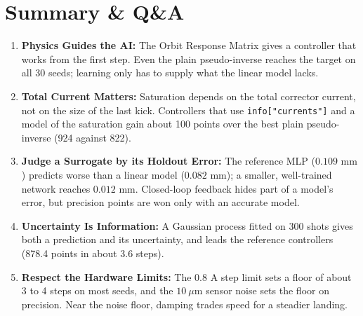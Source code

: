 \documentclass[11pt,a4paper]{article}
\begin{document}
\section{Summary \& Q\&A}

\begin{infobox}
\begin{enumerate}
    \item \textbf{Physics Guides the AI:} The Orbit Response Matrix gives a controller that works from the first step. Even the plain pseudo-inverse reaches the target on all 30 seeds; learning only has to supply what the linear model lacks.
    \item \textbf{Total Current Matters:} Saturation depends on the total corrector current, not on the size of the last kick. Controllers that use \texttt{info["currents"]} and a model of the saturation gain about 100 points over the best plain pseudo-inverse (924 against 822).
    \item \textbf{Judge a Surrogate by its Holdout Error:} The reference MLP ($0.109\text{ mm}$) predicts worse than a linear model ($0.082\text{ mm}$); a smaller, well-trained network reaches $0.012\text{ mm}$. Closed-loop feedback hides part of a model's error, but precision points are won only with an accurate model.
    \item \textbf{Uncertainty Is Information:} A Gaussian process fitted on 300 shots gives both a prediction and its uncertainty, and leads the reference controllers (878.4 points in about 3.6 steps).
    \item \textbf{Respect the Hardware Limits:} The $0.8\text{ A}$ step limit sets a floor of about 3 to 4 steps on most seeds, and the $10\ \mu\text{m}$ sensor noise sets the floor on precision. Near the noise floor, damping trades speed for a steadier landing.
\end{enumerate}
\end{infobox}
\end{document}
